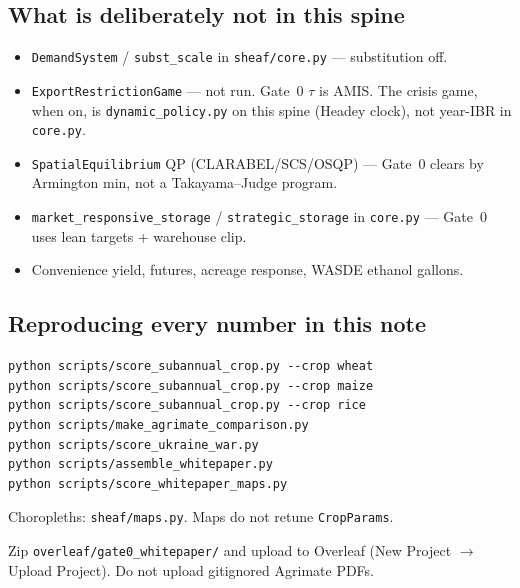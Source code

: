 \subsection{What is deliberately not in this spine}

\begin{itemize}
\item \texttt{DemandSystem} / \texttt{subst\_scale} in \texttt{sheaf/core.py}
      --- substitution off.
\item \texttt{ExportRestrictionGame} --- not run. Gate~0 $\tau$ is AMIS.
      The crisis game, when on, is \texttt{dynamic\_policy.py} on this
      spine (Headey clock), not year-IBR in \texttt{core.py}.
\item \texttt{SpatialEquilibrium} QP (CLARABEL/SCS/OSQP) --- Gate~0 clears
      by Armington min, not a Takayama--Judge program.
\item \texttt{market\_responsive\_storage} / \texttt{strategic\_storage} in
      \texttt{core.py} --- Gate~0 uses lean targets + warehouse clip.
\item Convenience yield, futures, acreage response, WASDE ethanol gallons.
\end{itemize}

\subsection{Reproducing every number in this note}

\begin{verbatim}
python scripts/score_subannual_crop.py --crop wheat
python scripts/score_subannual_crop.py --crop maize
python scripts/score_subannual_crop.py --crop rice
python scripts/make_agrimate_comparison.py
python scripts/score_ukraine_war.py
python scripts/assemble_whitepaper.py
python scripts/score_whitepaper_maps.py
\end{verbatim}

Choropleths: \texttt{sheaf/maps.py}. Maps do not retune \texttt{CropParams}.

Zip \texttt{overleaf/gate0\_whitepaper/} and upload to Overleaf
(New Project $\to$ Upload Project). Do not upload gitignored Agrimate PDFs.
